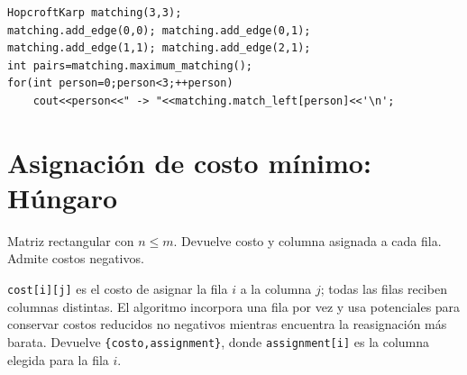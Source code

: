 \begin{lstlisting}[style=cpp]
HopcroftKarp matching(3,3);
matching.add_edge(0,0); matching.add_edge(0,1);
matching.add_edge(1,1); matching.add_edge(2,1);
int pairs=matching.maximum_matching();
for(int person=0;person<3;++person)
    cout<<person<<" -> "<<matching.match_left[person]<<'\n';
\end{lstlisting}

\section{Asignaci\'on de costo m\'inimo: H\'ungaro}

Matriz rectangular con $n\le m$. Devuelve costo y columna asignada a cada fila.
Admite costos negativos.

\texttt{cost[i][j]} es el costo de asignar la fila $i$ a la columna $j$; todas
las filas reciben columnas distintas. El algoritmo incorpora una fila por vez y
usa potenciales para conservar costos reducidos no negativos mientras encuentra
la reasignaci\'on m\'as barata. Devuelve \texttt{\{costo,assignment\}}, donde
\texttt{assignment[i]} es la columna elegida para la fila $i$.


